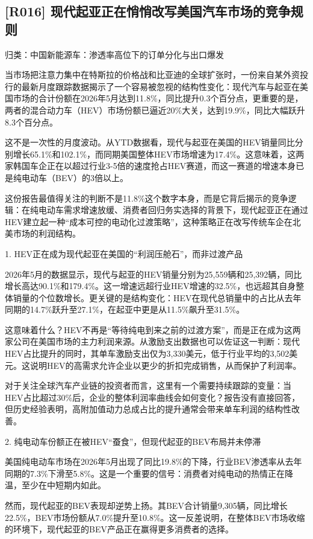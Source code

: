 \documentclass[11pt]{ctexart}
\begin{document}
\subsection{[R016] 现代起亚正在悄悄改写美国汽车市场的竞争规则}
{\small\color{refgray}归类：中国新能源车：渗透率高位下的订单分化与出口爆发}

当市场把注意力集中在特斯拉的价格战和比亚迪的全球扩张时，一份来自某外资投行的最新月度跟踪数据揭示了一个容易被忽视的结构性变化：现代汽车与起亚在美国市场的合计份额在2026年5月达到11.8\%，同比提升0.3个百分点，更重要的是，两者的混合动力车（HEV）市场份额已逼近20\%大关，达到19.9\%，同比大幅跃升8.3个百分点。

这不是一次性的月度波动。从YTD数据看，现代与起亚在美国的HEV销量同比分别增长65.1\%和102.1\%，而同期美国整体HEV市场增速为17.4\%。这意味着，这两家韩国车企正在以超过行业3-5倍的速度抢占HEV赛道，而这一赛道的增速本身已是纯电动车（BEV）的3倍以上。

这份报告最值得关注的判断不是11.8\%这个数字本身，而是它背后揭示的竞争逻辑：在纯电动车需求增速放缓、消费者回归务实选择的背景下，现代起亚正在通过HEV建立起一种“成本可控的电动化过渡策略”，这种策略正在改写传统车企在北美市场的利润结构。

1. HEV正在成为现代起亚在美国的“利润压舱石”，而非过渡产品

2026年5月的数据显示，现代与起亚的HEV销量分别为25,559辆和25,392辆，同比增长高达90.1\%和179.4\%。这一增速远超行业HEV增速的32.5\%，也远超其自身整体销量的个位数增长。更关键的是结构变化：HEV在现代总销量中的占比从去年同期的14.7\%跃升至27.1\%，在起亚中更是从11.5\%飙升至31.5\%。

这意味着什么？HEV不再是“等待纯电到来之前的过渡方案”，而是正在成为这两家公司在美国市场的主力利润来源。从激励支出数据也可以佐证这一判断：现代HEV占比提升的同时，其单车激励支出仅为3,330美元，低于行业平均的3,502美元。这说明HEV的高需求允许企业以更少的折扣完成销售，从而保护了利润率。

对于关注全球汽车产业链的投资者而言，这里有一个需要持续跟踪的变量：当HEV占比超过30\%后，企业的整体利润率曲线会如何变化？报告没有直接回答，但历史经验表明，高附加值动力总成占比的提升通常会带来单车利润的结构性改善。

2. 纯电动车份额正在被HEV“蚕食”，但现代起亚的BEV布局并未停滞

美国纯电动车市场在2026年5月出现了同比19.8\%的下降，行业BEV渗透率从去年同期的7.3\%下滑至5.8\%。这是一个重要的信号：消费者对纯电动的热情正在降温，至少在中短期内如此。

然而，现代起亚的BEV表现却逆势上扬。其BEV合计销量9,305辆，同比增长22.5\%，BEV市场份额从7.0\%提升至10.8\%。这一反差说明，在整体BEV市场收缩的环境下，现代起亚的BEV产品正在赢得更多消费者的选择。
\end{document}
